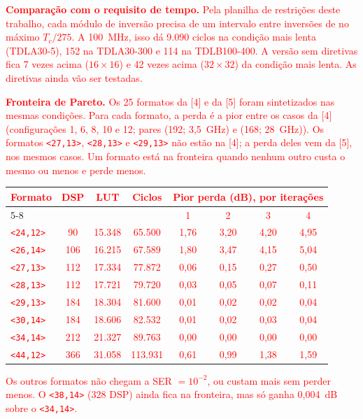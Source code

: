 \documentclass[11pt]{article}
\newcommand{\novo}[1]{\textcolor{red}{#1}}
\begin{document}
\novo{\textbf{Comparação com o requisito de tempo.} Pela planilha de restrições deste trabalho, cada
módulo de inversão precisa de um intervalo entre inversões de no máximo $T_c / 275$. A 100~MHz,
isso dá 9.090 ciclos na condição mais lenta (TDLA30-5), 152 na TDLA30-300 e 114 na TDLB100-400.
A versão sem diretivas fica 7 vezes acima ($16 \times 16$) e 42 vezes acima ($32 \times 32$) da
condição mais lenta. As diretivas ainda vão ser testadas.}

\novo{\textbf{Fronteira de Pareto.} Os 25 formatos da [4] e da [5] foram sintetizados nas mesmas
condições. Para cada formato, a perda é a pior entre os casos da [4] (configurações 1, 6, 8,
10 e 12; pares (192; 3,5~GHz) e (168; 28~GHz)). Os formatos \texttt{<27,13>}, \texttt{<28,13>} e
\texttt{<29,13>} não estão na [4]; a perda deles vem da [5], nos mesmos casos. Um formato está na
fronteira quando nenhum outro custa o mesmo ou menos e perde menos.}
\begin{center}
\small
\renewcommand{\arraystretch}{1.15}
\begin{tabular}{|l|c|c|c|c|c|c|c|}
\hline
\novo{Formato} & \novo{DSP} & \novo{LUT} & \novo{Ciclos} & \multicolumn{4}{c|}{\novo{Pior perda (dB), por iterações}} \\
\cline{5-8}
 & & & & \novo{1} & \novo{2} & \novo{3} & \novo{4} \\
\hline
\novo{\texttt{<24,12>}} & \novo{90}  & \novo{15.348} & \novo{65.500} & \novo{1,76} & \novo{3,20} & \novo{4,20} & \novo{4,95} \\
\novo{\texttt{<26,14>}} & \novo{106} & \novo{16.215} & \novo{67.589} & \novo{1,80} & \novo{3,47} & \novo{4,15} & \novo{5,04} \\
\novo{\texttt{<27,13>}} & \novo{112} & \novo{17.334} & \novo{77.872} & \novo{0,06} & \novo{0,15} & \novo{0,27} & \novo{0,50} \\
\novo{\texttt{<28,13>}} & \novo{112} & \novo{17.721} & \novo{79.720} & \novo{0,03} & \novo{0,05} & \novo{0,07} & \novo{0,11} \\
\novo{\texttt{<29,13>}} & \novo{184} & \novo{18.304} & \novo{81.600} & \novo{0,01} & \novo{0,02} & \novo{0,02} & \novo{0,04} \\
\novo{\texttt{<30,14>}} & \novo{184} & \novo{18.606} & \novo{82.532} & \novo{0,01} & \novo{0,02} & \novo{0,03} & \novo{0,04} \\
\novo{\texttt{<34,14>}} & \novo{212} & \novo{21.327} & \novo{89.763} & \novo{0,00} & \novo{0,00} & \novo{0,00} & \novo{0,00} \\
\novo{\texttt{<44,12>}} & \novo{366} & \novo{31.058} & \novo{113.931} & \novo{0,61} & \novo{0,99} & \novo{1,38} & \novo{1,59} \\
\hline
\end{tabular}
\end{center}
\novo{Os outros formatos não chegam a SER $= 10^{-2}$, ou custam mais sem perder menos. O
\texttt{<38,14>} (328 DSP) ainda fica na fronteira, mas só ganha 0,004~dB sobre o \texttt{<34,14>}.}
\end{document}
